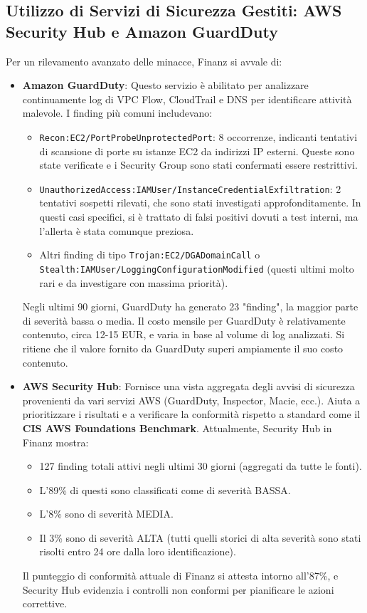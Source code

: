 \subsection{Utilizzo di Servizi di Sicurezza Gestiti: AWS Security Hub e Amazon GuardDuty}
\label{subsec:security-hub-guardduty_cap2}
Per un rilevamento avanzato delle minacce, Finanz si avvale di:
\begin{itemize}
    \item \textbf{Amazon GuardDuty}: Questo servizio è abilitato per analizzare continuamente log di VPC Flow, CloudTrail e DNS per identificare attività malevole.
    I finding più comuni includevano:
        \begin{itemize}
            \item \texttt{Recon:EC2/PortProbeUnprotectedPort}: 8 occorrenze, indicanti tentativi di scansione di porte su istanze EC2 da indirizzi IP esterni. Queste sono state verificate e i Security Group sono stati confermati essere restrittivi.
            \item \texttt{UnauthorizedAccess:IAMUser/InstanceCredentialExfiltration}: 2 tentativi sospetti rilevati, che sono stati investigati approfonditamente. In questi casi specifici, si è trattato di falsi positivi dovuti a test interni, ma l'allerta è stata comunque preziosa.
            \item Altri finding di tipo \texttt{Trojan:EC2/DGADomainCall} o \texttt{Stealth:IAMUser/LoggingConfigurationModified} (questi ultimi molto rari e da investigare con massima priorità).
        \end{itemize} Negli ultimi 90 giorni, GuardDuty ha generato 23 "finding", la maggior parte di severità bassa o media. Il costo mensile per GuardDuty è relativamente contenuto, circa 12-15 EUR, e varia in base al volume di log analizzati. Si ritiene che il valore fornito da GuardDuty superi ampiamente il suo costo contenuto.
    \item \textbf{AWS Security Hub}: Fornisce una vista aggregata degli avvisi di sicurezza provenienti da vari servizi AWS (GuardDuty, Inspector, Macie, ecc.). Aiuta a prioritizzare i risultati e a verificare la conformità rispetto a standard come il \textbf{CIS AWS Foundations Benchmark}. Attualmente, Security Hub in Finanz mostra:
    \begin{itemize}
        \item 127 finding totali attivi negli ultimi 30 giorni (aggregati da tutte le fonti).
        \item L'89\% di questi sono classificati come di severità BASSA.
        \item L'8\% sono di severità MEDIA.
        \item Il 3\% sono di severità ALTA (tutti quelli storici di alta severità sono stati risolti entro 24 ore dalla loro identificazione).
    \end{itemize} Il punteggio di conformità attuale di Finanz si attesta intorno all'87\%, e Security Hub evidenzia i controlli non conformi per pianificare le azioni correttive.
\end{itemize}

